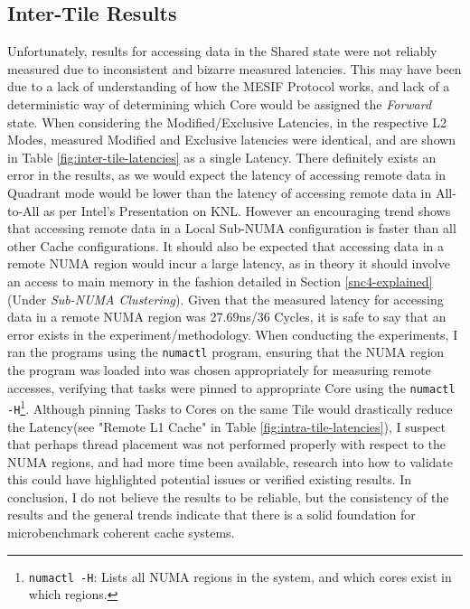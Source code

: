 \documentclass[bsc,frontabs,twoside,singlespacing,parskip,deptreport]{infthesis}     %
\begin{document}
\subsection{Inter-Tile Results}
Unfortunately, results for accessing data in the Shared state were not reliably measured due to inconsistent and bizarre measured latencies. This may have been due to a lack of understanding of how the MESIF Protocol works, and lack of a deterministic way of determining which Core would be assigned the \emph{Forward} state. When considering the Modified/Exclusive Latencies, in the respective L2 Modes, measured Modified and Exclusive latencies were identical, and are shown in Table \ref{fig:inter-tile-latencies} as a single Latency. There definitely exists an error in the results, as we would expect the latency of accessing remote data in Quadrant mode would be lower than the latency of accessing remote data in All-to-All as per Intel's Presentation on KNL\cite{intel_pres}. However an encouraging trend shows that accessing remote data in a Local Sub-NUMA configuration is faster than all other Cache configurations. It should also be expected that accessing data in a remote NUMA region would incur a large latency, as in theory it should involve an access to main memory in the fashion detailed in Section \ref{snc4-explained}(Under \textit{Sub-NUMA Clustering}). Given that the measured latency for accessing data in a remote NUMA region was 27.69ns/36 Cycles, it is safe to say that an error exists in the experiment/methodology. When conducting the experiments, I ran the programs using the \texttt{numactl} program, ensuring that the NUMA region the program was loaded into was chosen appropriately for measuring remote accesses, verifying that tasks were pinned to appropriate Core using the \texttt{numactl -H}\footnote{\texttt{numactl -H}: Lists all NUMA regions in the system, and which cores exist in which regions.}. Although pinning Tasks to Cores on the same Tile would drastically reduce the Latency(see "Remote L1 Cache" in Table \ref{fig:intra-tile-latencies}), I suspect that perhaps thread placement was not performed properly with respect to the NUMA regions, and had more time been available, research into how to validate this could have highlighted potential issues or verified existing results. In conclusion, I do not believe the results to be reliable, but the consistency of the results and the general trends indicate that there is a solid foundation for microbenchmark coherent cache systems.
\end{document}
